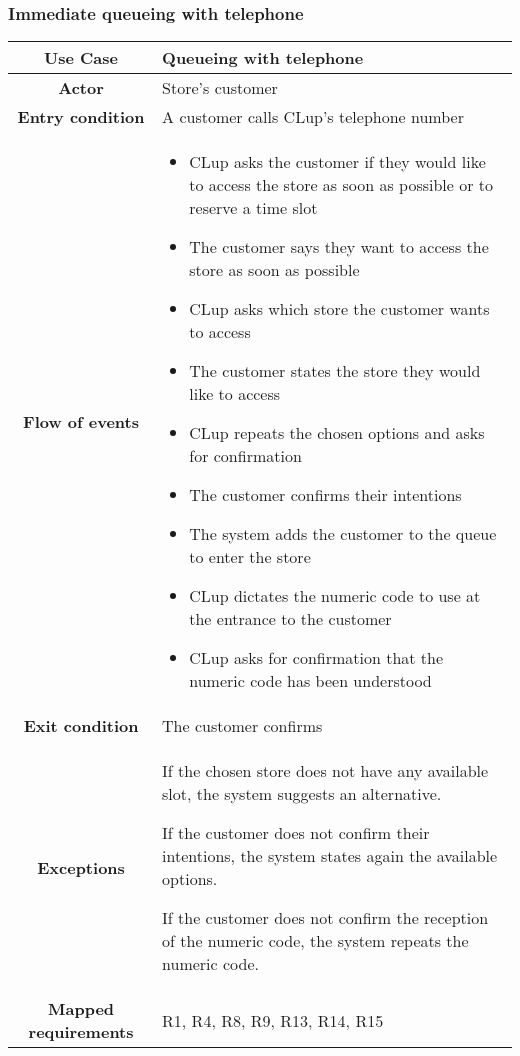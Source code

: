 \documentclass[../../main.tex]{subfiles}
\begin{document}
      \subsubsection{Immediate queueing with telephone}

      \begin{table}[H]
        \centering
          \begin{tabular}{c m{}}
          \hline
          \textbf{Use Case} & Queueing with telephone\\ \hline
          \textbf{Actor} & Store's customer\\ \hline
          \textbf{Entry condition} & A customer calls CLup's telephone number\\  \hline
          \textbf{Flow of events} & \begin{itemize}
                                      \item CLup asks the customer if they would like to access the store as soon as possible or to reserve a time slot
                                      \item The customer says they want to access the store as soon as possible
                                      \item CLup asks which store the customer wants to access
                                      \item The customer states the store they would like to access
                                      \item CLup repeats the chosen options and asks for confirmation
                                      \item The customer confirms their intentions
                                      \item The system adds the customer to the queue to enter the store
                                      \item CLup dictates the numeric code to use at the entrance to the customer
                                      \item CLup asks for confirmation that the numeric code has been understood
                                    \end{itemize}\\ \hline
          \textbf{Exit condition} & The customer confirms \\ \hline
          \textbf{Exceptions} & If the chosen store does not have any available slot, the system suggests an alternative.
          
                                If the customer does not confirm their intentions, the system states again the available options.
                                
                                If the customer does not confirm the reception of the numeric code, the system repeats the numeric code.\\ \hline
          \textbf{Mapped requirements} & R1, R4, R8, R9, R13, R14, R15\\ \hline
                              \end{tabular}
      \end{table}
\end{document}
